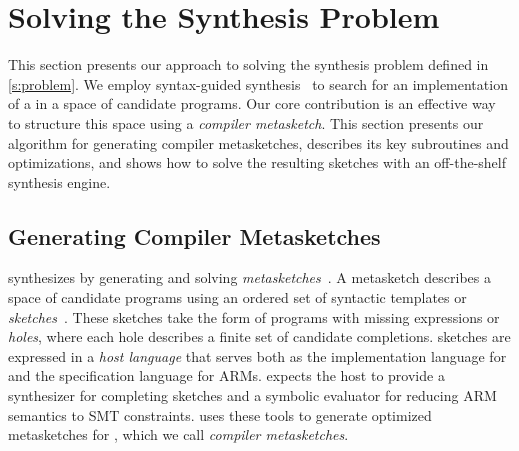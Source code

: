 

\section{Solving the \MiniCompiler Synthesis Problem}
\label{s:algorithm}

This section presents our approach to solving the \minicompiler synthesis
problem defined in \autoref{s:problem}. We employ syntax-guided
synthesis~\cite{solar-lezama:sketch} to search for an implementation of a
\minicompiler in a space of candidate programs. Our core contribution is an
effective way to structure this space using a \emph{compiler metasketch}. This
section presents our algorithm for generating compiler metasketches, describes
its key subroutines and optimizations, and shows how to solve the resulting
sketches with an off-the-shelf synthesis engine.\tighten


\subsection{Generating Compiler Metasketches}

\jitsynth synthesizes \minicompilers by generating and solving
\emph{metasketches}~\cite{bornholt:synapse}. A metasketch describes a space of
candidate programs using an ordered set of syntactic templates or
\emph{sketches}~\cite{solar-lezama:sketch}. These sketches take the form of
programs with missing expressions or \emph{holes}, where each hole describes a
finite set of candidate completions. \jitsynth sketches are expressed in a
\emph{host language} \host that serves both as the implementation language for
\minicompilers and the specification language for ARMs. \jitsynth expects the
host to provide a synthesizer for completing sketches and a symbolic evaluator
for reducing ARM semantics to SMT constraints. \jitsynth uses these tools to
generate optimized metasketches for \minicompilers, which we call \emph{compiler
metasketches}.\tighten

